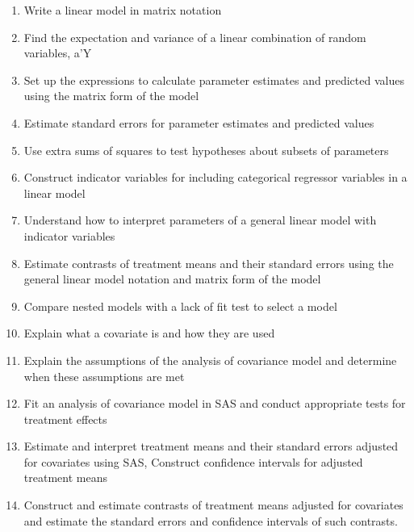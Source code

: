 \documentclass[
]{book}
\theoremstyle{definition}
\theoremstyle{definition}
\theoremstyle{definition}
\theoremstyle{remark}
\begin{document}
\begin{enumerate}
\item
  Write a linear model in matrix notation
\item
  Find the expectation and variance of a linear combination of random variables, a'Y
\item
  Set up the expressions to calculate parameter estimates and predicted values using the matrix form of the model
\item
  Estimate standard errors for parameter estimates and predicted values
\item
  Use extra sums of squares to test hypotheses about subsets of parameters
\item
  Construct indicator variables for including categorical regressor variables in a linear model
\item
  Understand how to interpret parameters of a general linear model with indicator variables
\item
  Estimate contrasts of treatment means and their standard errors using the general linear model notation and matrix form of the model
\item
  Compare nested models with a lack of fit test to select a model
\item
  Explain what a covariate is and how they are used
\item
  Explain the assumptions of the analysis of covariance model and determine when these assumptions are met
\item
  Fit an analysis of covariance model in SAS and conduct appropriate tests for treatment effects
\item
  Estimate and interpret treatment means and their standard errors adjusted for covariates using SAS, Construct confidence intervals for adjusted treatment means
\item
  Construct and estimate contrasts of treatment means adjusted for covariates and estimate the standard errors and confidence intervals of such contrasts.
\end{enumerate}
\end{document}
